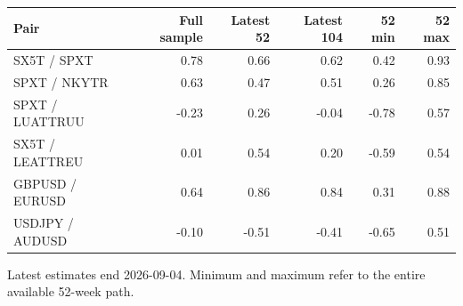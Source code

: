 \par\medskip\noindent
{\small
\begin{tabular}{@{}lrrrrr@{}}
\toprule
Pair & Full sample & Latest 52 & Latest 104 & 52 min & 52 max\\
\midrule
SX5T / SPXT & 0.78 & 0.66 & 0.62 & 0.42 & 0.93\\
SPXT / NKYTR & 0.63 & 0.47 & 0.51 & 0.26 & 0.85\\
SPXT / LUATTRUU & -0.23 & 0.26 & -0.04 & -0.78 & 0.57\\
SX5T / LEATTREU & 0.01 & 0.54 & 0.20 & -0.59 & 0.54\\
GBPUSD / EURUSD & 0.64 & 0.86 & 0.84 & 0.31 & 0.88\\
USDJPY / AUDUSD & -0.10 & -0.51 & -0.41 & -0.65 & 0.51\\
\bottomrule
\end{tabular}
}
\par\medskip
Latest estimates end 2026-09-04. Minimum and maximum refer to the entire available 52-week path.
